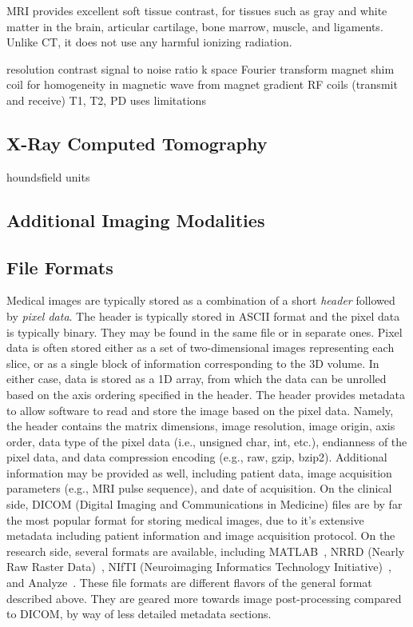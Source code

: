 MRI provides excellent soft tissue contrast, for tissues such as gray and white matter in the brain, articular cartilage, bone marrow, muscle, and ligaments. Unlike CT, it does not use any harmful ionizing radiation.

resolution
contrast
signal to noise ratio
k space
Fourier transform
magnet
shim coil for homogeneity in magnetic wave from magnet
gradient
RF coils (transmit and receive)
T1, T2, PD
uses
limitations  

\subsection{X-Ray Computed Tomography}
\label{X-Ray Computed Tomography}

houndsfield units

\subsection{Additional Imaging Modalities}
\label{Other Imaging Modalities}

\subsection{File Formats}
\label{Data Format-IMG}

Medical images are typically stored as a combination of a short \textit{header} followed by \textit{pixel data}. The header is typically stored in ASCII format and the pixel data is typically binary. They may be found in the same file or in separate ones. Pixel data is often stored either as a set of two-dimensional images representing each slice, or as a single block of information corresponding to the 3D volume. In either case, data is stored as a 1D array, from which the data can be unrolled based on the axis ordering specified in the header. The header provides metadata to allow software to read and store the image based on the pixel data. Namely, the header contains the matrix dimensions, image resolution, image origin, axis order, data type of the pixel data (i.e., unsigned char, int, etc.), endianness of the pixel data, and data compression encoding (e.g., raw, gzip, bzip2). Additional information may be provided as well, including patient data, image acquisition parameters (e.g., MRI pulse sequence), and date of acquisition. On the clinical side, DICOM (Digital Imaging and Communications in Medicine) files are by far the most popular format for storing medical images, due to it's extensive metadata including patient information and image acquisition protocol. On the research side, several formats are available, including MATLAB~\cite{MATLAB}, NRRD (Nearly Raw Raster Data)~\cite{nrrd}, NIfTI (Neuroimaging Informatics Technology Initiative)~\cite{nifti}, and Analyze~\cite{analyzedirect}. These file formats are different flavors of the general format described above. They are geared more towards image post-processing compared to DICOM, by way of less detailed metadata sections.



